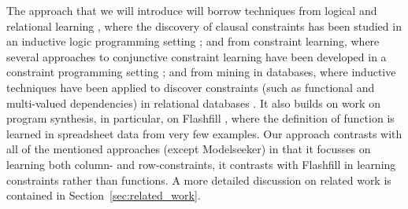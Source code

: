 \documentclass{sig-alternate-05-2015}
\newcommand{\tias}[1]{\textcolor{blue}{{\sc Tias:} #1}\xspace}
\begin{document}
The approach that we will introduce will borrow techniques from logical and relational learning \cite{luc_book}, where
the discovery of clausal constraints has been studied in an inductive logic programming setting \cite{claudien,lallouet}; and from constraint learning,  where several approaches to conjunctive constraint learning have been developed in a constraint programming setting \cite{Quacq,Conacq,modelseeker}; 
and from mining in databases, where inductive techniques have been applied to discover constraints (such as functional and multi-valued dependencies) in relational databases \cite{Shavlik}.  It also builds on work on program synthesis, in particular, on Flashfill \cite{flashfill}, where the definition of function is learned in spreadsheet data from
very few examples.  Our approach contrasts with all of the mentioned approaches (except Modelseeker) in that it focusses
on learning both column- and row-constraints, it contrasts with Flashfill in learning constraints rather than functions.
A more detailed discussion on related work is contained in Section~\ref{sec:related_work}.


\end{document}
